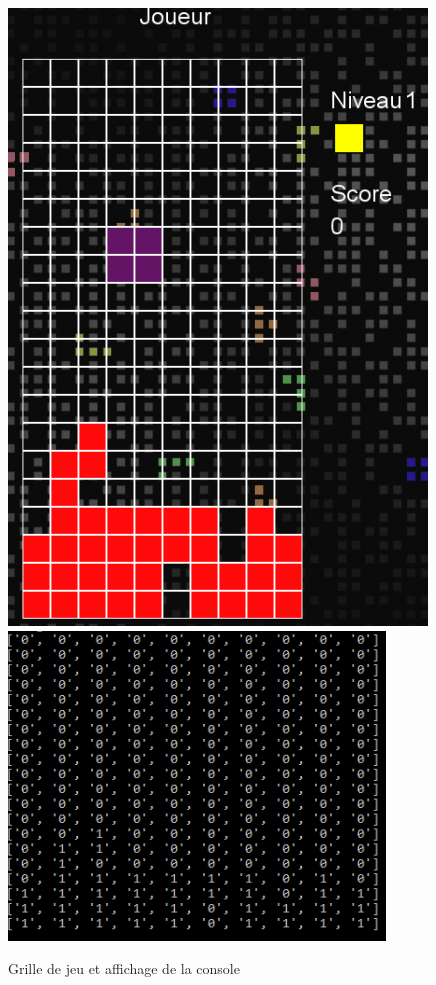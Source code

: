 \documentclass[a4paper, 11pt]{article}
\begin{document}
\begin{itemize}
\begin{itemize}
    				\begin{figure}[ht]
                		\centering
    						\includegraphics[scale=0.3]{images/Jeu.png}
    						\includegraphics[scale=0.5]{images/console.png}
    					\caption{Grille de jeu et affichage de la console}
            		\end{figure}
            		

\end{itemize}
\end{itemize}
\end{document}
